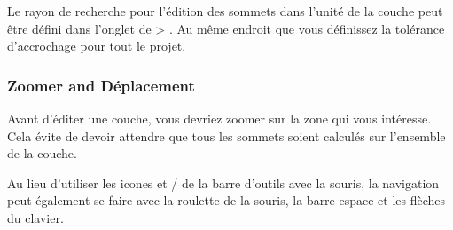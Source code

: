 \begin{itemize}
Le rayon de recherche pour l'édition des sommets dans l'unité de la couche peut être défini dans l'onglet  de  > . Au même endroit que vous définissez la tolérance d'accrochage pour tout le projet.

\subsubsection{Zoomer and Déplacement}


Avant d'éditer une couche, vous devriez zoomer sur la zone qui vous intéresse. Cela évite de devoir attendre que tous les sommets soient calculés sur l'ensemble de la couche.


Au lieu d'utiliser les icones  et / de la barre d'outils avec la souris, la navigation peut également se faire avec la roulette de la souris, la barre espace et les flèches du clavier.




\end{itemize}
